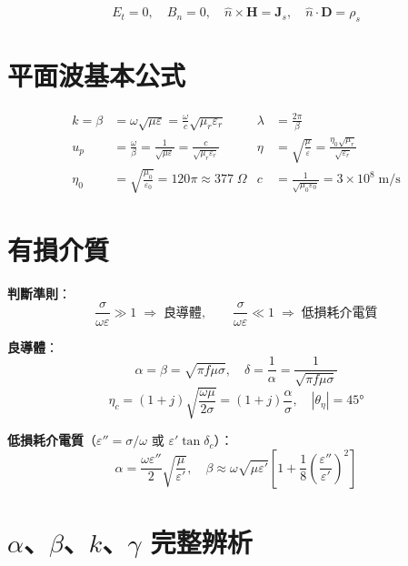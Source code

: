 \documentclass[12pt,a4paper]{article}
\newcommand{\vH}{\mathbf{H}}
\newcommand{\vJ}{\mathbf{J}}
\newcommand{\vD}{\mathbf{D}}
\begin{document}
\begin{formulabox}
\[
  E_t = 0, \quad B_n = 0, \quad \hat{n}\times\vH = \vJ_s, \quad \hat{n}\cdot\vD = \rho_s
\]
\end{formulabox}

\section{平面波基本公式}

\begin{formulabox}[無損介質]
\begin{align*}
  k = \beta &= \omega\sqrt{\mu\varepsilon} = \frac{\omega}{c}\sqrt{\mu_r\varepsilon_r}
  & \lambda &= \frac{2\pi}{\beta} \\[6pt]
  u_p &= \frac{\omega}{\beta} = \frac{1}{\sqrt{\mu\varepsilon}} = \frac{c}{\sqrt{\mu_r\varepsilon_r}}
  & \eta &= \sqrt{\frac{\mu}{\varepsilon}} = \frac{\eta_0\sqrt{\mu_r}}{\sqrt{\varepsilon_r}} \\[6pt]
  \eta_0 &= \sqrt{\frac{\mu_0}{\varepsilon_0}} = 120\pi \approx 377\;\Omega
  & c &= \frac{1}{\sqrt{\mu_0\varepsilon_0}} = 3\times10^8\;\text{m/s}
\end{align*}
\end{formulabox}

\section{有損介質}

\begin{formulabox}[有損介質分類與公式]
\textbf{判斷準則}：
\[
  \frac{\sigma}{\omega\varepsilon} \gg 1 \;\Rightarrow\; \text{良導體}, \qquad
  \frac{\sigma}{\omega\varepsilon} \ll 1 \;\Rightarrow\; \text{低損耗介電質}
\]

\textbf{良導體}：
\[
  \alpha = \beta = \sqrt{\pi f \mu \sigma}, \quad
  \delta = \frac{1}{\alpha} = \frac{1}{\sqrt{\pi f \mu \sigma}}
\]
\[
  \eta_c = (1+j)\sqrt{\frac{\omega\mu}{2\sigma}} = (1+j)\frac{\alpha}{\sigma}, \quad
  |\theta_\eta| = 45°
\]

\textbf{低損耗介電質}（$\varepsilon'' = \sigma/\omega$ 或 $\varepsilon'\tan\delta_c$）：
\[
  \alpha = \frac{\omega\varepsilon''}{2}\sqrt{\frac{\mu}{\varepsilon'}}, \quad
  \beta \approx \omega\sqrt{\mu\varepsilon'}\left[1 + \frac{1}{8}\left(\frac{\varepsilon''}{\varepsilon'}\right)^2\right]
\]
\end{formulabox}

\section{$\alpha$、$\beta$、$k$、$\gamma$ 完整辨析}
\end{document}
